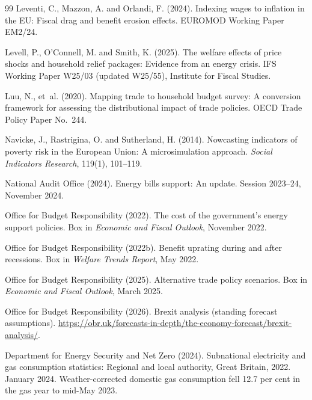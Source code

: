 \begin{thebibliography}{99}
Leventi, C., Mazzon, A. and Orlandi, F. (2024).
\newblock Indexing wages to inflation in the EU: Fiscal drag and benefit erosion effects.
\newblock EUROMOD Working Paper EM2/24.

Levell, P., O'Connell, M. and Smith, K. (2025).
\newblock The welfare effects of price shocks and household relief packages: Evidence from an energy crisis.
\newblock IFS Working Paper W25/03 (updated W25/55), Institute for Fiscal Studies.

Luu, N., et~al. (2020).
\newblock Mapping trade to household budget survey: A conversion framework for assessing the distributional impact of trade policies.
\newblock OECD Trade Policy Paper No.~244.

Navicke, J., Rastrigina, O. and Sutherland, H. (2014).
\newblock Nowcasting indicators of poverty risk in the European Union: A microsimulation approach.
\newblock \emph{Social Indicators Research}, 119(1), 101--119.

National Audit Office (2024).
\newblock Energy bills support: An update.
\newblock Session 2023--24, November 2024.

Office for Budget Responsibility (2022).
\newblock The cost of the government's energy support policies.
\newblock Box in \emph{Economic and Fiscal Outlook}, November 2022.

Office for Budget Responsibility (2022b).
\newblock Benefit uprating during and after recessions.
\newblock Box in \emph{Welfare Trends Report}, May 2022.

Office for Budget Responsibility (2025).
\newblock Alternative trade policy scenarios.
\newblock Box in \emph{Economic and Fiscal Outlook}, March 2025.

Office for Budget Responsibility (2026).
\newblock Brexit analysis (standing forecast assumptions).
\newblock \url{https://obr.uk/forecasts-in-depth/the-economy-forecast/brexit-analysis/}.

Department for Energy Security and Net Zero (2024).
\newblock Subnational electricity and gas consumption statistics: Regional and local authority, Great Britain, 2022.
 January 2024. Weather-corrected domestic gas consumption fell 12.7 per cent in the gas year to mid-May 2023.


\end{thebibliography}
